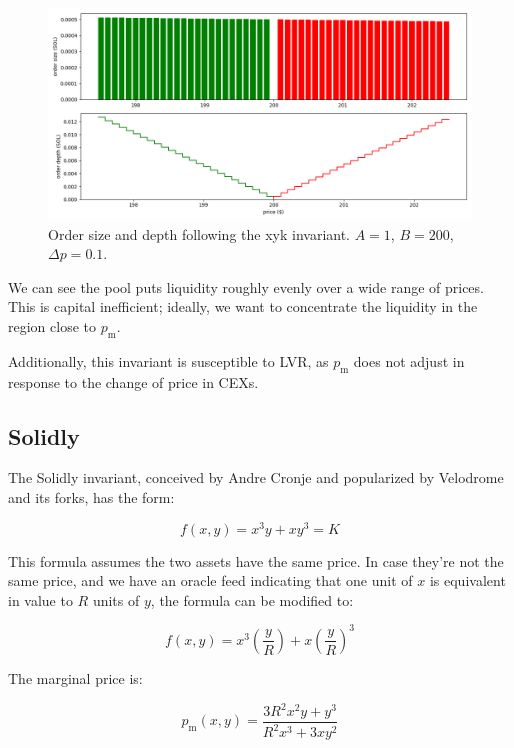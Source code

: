 \documentclass{article}
\begin{document}
\begin{figure}
  \includegraphics[width=\textwidth]{1-xyk.png}
  \caption{Order size and depth following the xyk invariant. $A = 1$, $B = 200$, $\Delta p = 0.1$.}
  \label{fig:1}
\end{figure}

We can see the pool puts liquidity roughly evenly over a wide range of prices. This is capital inefficient; ideally, we want to concentrate the liquidity in the region close to $p_{\mathrm{m}}$.

Additionally, this invariant is susceptible to LVR, as $p_{\mathrm{m}}$ does not adjust in response to the change of price in CEXs.

\subsection{Solidly}

The Solidly invariant, conceived by Andre Cronje\supercite{andrecronjetwitter} and popularized by Velodrome and its forks,\supercite{velodrome,aerodrome} has the form:

\begin{equation}
  f(x, y) = x^3 y + x y^3 = K
\end{equation}

This formula assumes the two assets have the same price. In case they're not the same price, and we have an oracle feed indicating that one unit of $x$ is equivalent in value to $R$ units of $y$, the formula can be modified to:

\begin{equation}
  f(x, y) = x^3 \left( \frac{y}{R} \right) + x \left( \frac{y}{R} \right)^3
\end{equation}

The marginal price is:

\begin{equation}
  p_{\mathrm{m}} (x, y) = \frac{3 R^2 x^2 y + y^3}{R^2 x^3 + 3 x y^2}
\end{equation}
\end{document}
